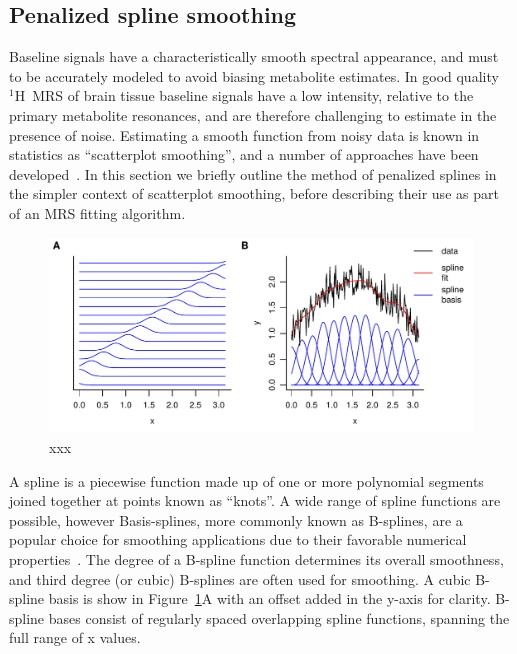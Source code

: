 \documentclass[num-refs]{wiley-article}
\newcommand{\proton}{\ensuremath{^1\mathrm{H}}}
\begin{document}
\subsection{Penalized spline smoothing}

Baseline signals have a characteristically smooth spectral appearance, and must to be accurately modeled to avoid biasing metabolite estimates. In good quality \proton\ MRS of brain tissue baseline signals have a low intensity, relative to the primary metabolite resonances, and are therefore challenging to estimate in the presence of noise. Estimating a smooth function from noisy data is known in statistics as ``scatterplot smoothing'', and a number of approaches have been developed~\cite{Ruppert2003}. In this section we briefly outline the method of penalized splines in the simpler context of scatterplot smoothing, before describing their use as part of an MRS fitting algorithm.

\begin{figure}
  \begin{center}
    \includegraphics[width=1\textwidth]{fig1.pdf}
    \caption{xxx}
    \label{bspline_regression}
  \end{center}
\end{figure}

A spline is a piecewise function made up of one or more polynomial segments joined together at points known as ``knots''. A wide range of spline functions are possible, however Basis-splines, more commonly known as B-splines, are a popular choice for smoothing applications due to their favorable numerical properties~\cite{DeBoor2001}. The degree of a B-spline function determines its overall smoothness, and third degree (or cubic) B-splines are often used for smoothing. A cubic B-spline basis is show in Figure~\ref{bspline_regression}A with an offset added in the y-axis for clarity. B-spline bases consist of regularly spaced overlapping spline functions, spanning the full range of x values.
\end{document}
